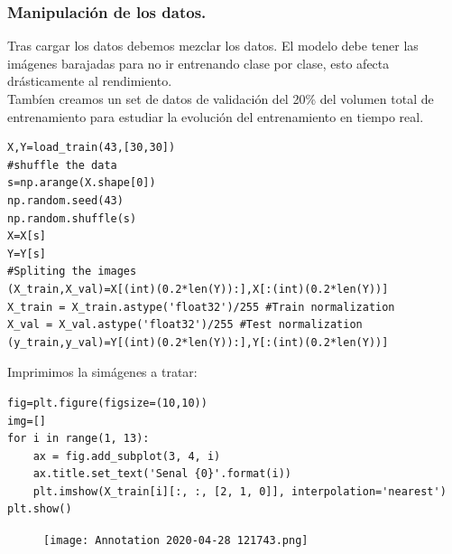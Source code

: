 \documentclass[a4paper,10pt]{article}
\begin{document}
\subsubsection{Manipulación de los datos.}
Tras cargar los datos debemos mezclar los datos. El modelo debe tener las imágenes barajadas para no ir entrenando clase por clase, esto afecta drásticamente al rendimiento. \\
Tambíen creamos un set de datos de validación del 20\% del volumen total de entrenamiento para estudiar la evolución del entrenamiento en tiempo real.
\begin{lstlisting}
X,Y=load_train(43,[30,30])
#shuffle the data
s=np.arange(X.shape[0])
np.random.seed(43)
np.random.shuffle(s)
X=X[s]
Y=Y[s]
#Spliting the images 
(X_train,X_val)=X[(int)(0.2*len(Y)):],X[:(int)(0.2*len(Y))]
X_train = X_train.astype('float32')/255 #Train normalization 
X_val = X_val.astype('float32')/255 #Test normalization
(y_train,y_val)=Y[(int)(0.2*len(Y)):],Y[:(int)(0.2*len(Y))]
\end{lstlisting}
Imprimimos la simágenes a tratar:
\begin{lstlisting}
fig=plt.figure(figsize=(10,10))
img=[]
for i in range(1, 13):
    ax = fig.add_subplot(3, 4, i)
    ax.title.set_text('Senal {0}'.format(i))
    plt.imshow(X_train[i][:, :, [2, 1, 0]], interpolation='nearest')
plt.show()
\end{lstlisting}
\begin{figure}[H]
\centering
\texttt{[image: Annotation 2020-04-28 121743.png]}

\end{figure}
\end{document}
